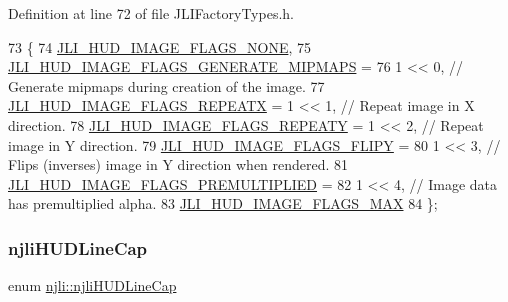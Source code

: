 Definition at line 72 of file J\+L\+I\+Factory\+Types.\+h.


\begin{DoxyCode}
73   \{
74     \mbox{\hyperlink{namespacenjli_a3c5203f27f547353dd9e29345d747b14a3d832b917bcf971e6af7fc247315f3f7}{JLI\_HUD\_IMAGE\_FLAGS\_NONE}},
75     \mbox{\hyperlink{namespacenjli_a3c5203f27f547353dd9e29345d747b14ab8ac62fa7584d10bb808169208ee3414}{JLI\_HUD\_IMAGE\_FLAGS\_GENERATE\_MIPMAPS}} =
76         1 << 0, \textcolor{comment}{// Generate mipmaps during creation of the image.}
77     \mbox{\hyperlink{namespacenjli_a3c5203f27f547353dd9e29345d747b14a52bcf7a4cf76ac843f7767be374febfd}{JLI\_HUD\_IMAGE\_FLAGS\_REPEATX}} = 1 << 1, \textcolor{comment}{// Repeat image in X direction.}
78     \mbox{\hyperlink{namespacenjli_a3c5203f27f547353dd9e29345d747b14a36d0da535a374881276f12c35219419a}{JLI\_HUD\_IMAGE\_FLAGS\_REPEATY}} = 1 << 2, \textcolor{comment}{// Repeat image in Y direction.}
79     \mbox{\hyperlink{namespacenjli_a3c5203f27f547353dd9e29345d747b14a1d6a4cb89637785d117a25bc46ed4236}{JLI\_HUD\_IMAGE\_FLAGS\_FLIPY}} =
80         1 << 3, \textcolor{comment}{// Flips (inverses) image in Y direction when rendered.}
81     \mbox{\hyperlink{namespacenjli_a3c5203f27f547353dd9e29345d747b14a5c5b0641a587235772732d12a3199c8a}{JLI\_HUD\_IMAGE\_FLAGS\_PREMULTIPLIED}} =
82         1 << 4, \textcolor{comment}{// Image data has premultiplied alpha.}
83     \mbox{\hyperlink{namespacenjli_a3c5203f27f547353dd9e29345d747b14a1d866118aee61252ba1f3508cad3c6a0}{JLI\_HUD\_IMAGE\_FLAGS\_MAX}}
84   \};
\end{DoxyCode}
\mbox{\label{namespacenjli_ae73ef7aff697689e327df8c62325f30d}} 
\subsubsection{\texorpdfstring{njli\+H\+U\+D\+Line\+Cap}{njliHUDLineCap}}
{\footnotesize\ttfamily enum \mbox{\hyperlink{namespacenjli_ae73ef7aff697689e327df8c62325f30d}{njli\+::njli\+H\+U\+D\+Line\+Cap}}}

